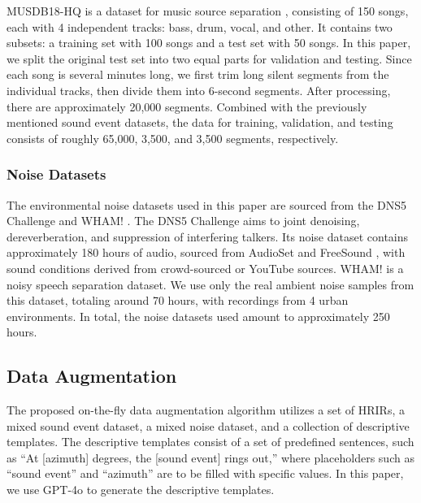 \documentclass{IEEEtran}
\begin{document}
MUSDB18-HQ is a dataset for music source separation \cite{luo2023music}, consisting of 150 songs, each with 4 independent tracks: bass, drum, vocal, and other. It contains two subsets: a training set with 100 songs and a test set with 50 songs. In this paper, we split the original test set into two equal parts for validation and testing. Since each song is several minutes long, we first trim long silent segments from the individual tracks, then divide them into 6-second segments. After processing, there are approximately 20,000 segments. Combined with the previously mentioned sound event datasets, the data for training, validation, and testing consists of roughly 65,000, 3,500, and 3,500 segments, respectively.

\subsubsection{Noise Datasets}
The environmental noise datasets used in this paper are sourced from the DNS5 Challenge \cite{dubey2023icassp} and WHAM! \cite{wichern2019wham}. The DNS5 Challenge \cite{dubey2023icassp} aims to joint denoising, dereverberation, and suppression of interfering talkers. Its noise dataset contains approximately 180 hours of audio, sourced from AudioSet \cite{gemmeke2017audio} and FreeSound \cite{fonseca2017freesound}, with sound conditions derived from crowd-sourced or YouTube sources. WHAM! \cite{wichern2019wham} is a noisy speech separation dataset. We use only the real ambient noise samples from this dataset, totaling around 70 hours, with recordings from 4 urban environments. In total, the noise datasets used amount to approximately 250 hours.

\subsection{Data Augmentation}
The proposed on-the-fly data augmentation algorithm utilizes a set of HRIRs, a mixed sound event dataset, a mixed noise dataset, and a collection of descriptive templates. The descriptive templates consist of a set of predefined sentences, such as ``At [azimuth] degrees, the [sound event] rings out,'' where placeholders such as ``sound event'' and ``azimuth'' are to be filled with specific values. In this paper, we use GPT-4o \cite{achiam2023gpt} to generate the descriptive templates.
\end{document}
